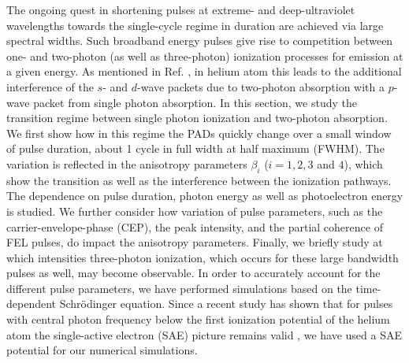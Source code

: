 The ongoing quest in shortening pulses at extreme- and deep-ultraviolet wavelengths towards the single-cycle regime in duration are achieved via large spectral widths. Such broadband energy pulses give rise to competition between one- and two-photon (as well as three-photon) ionization processes for emission at a given energy. As mentioned in Ref. \cite{boll2019}, in helium atom this leads to the additional interference of the $s$- and $d$-wave packets due to two-photon absorption with a $p$-wave packet from single photon absorption. In this section, we study the transition regime between single photon ionization and two-photon absorption. We first show how in this regime the PADs quickly change over a small window of pulse duration, about 1 cycle in full width at half maximum (FWHM). The variation is reflected in the anisotropy parameters $\beta_i$ ($i = 1, 2, 3$ and $4$), which show the transition as well as the interference between the ionization pathways. The dependence on pulse duration, photon energy as well as photoelectron energy is studied. We further consider how variation of pulse parameters, such as the carrier-envelope-phase (CEP), the peak intensity, and the partial coherence of FEL pulses, do impact the anisotropy parameters. Finally, we briefly study at which intensities three-photon ionization, which occurs for these large bandwidth pulses as well, may become observable. In order to accurately account for the different pulse parameters, we have performed simulations based on the time-dependent Schr\"odinger equation. Since a recent study has shown that for pulses with central photon frequency below the first ionization potential of the helium atom the single-active electron (SAE) picture remains valid \cite{boll2019}, we have used a SAE potential for our numerical simulations. 

